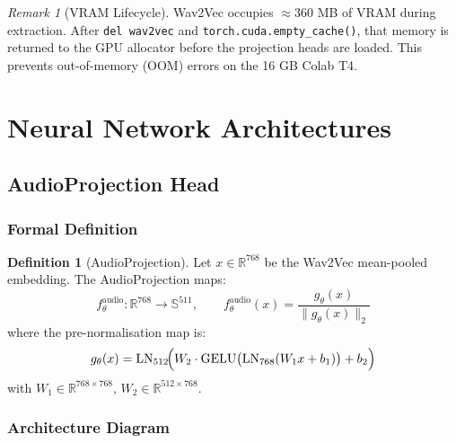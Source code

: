 \documentclass[12pt,a4paper]{article}
\theoremstyle{definition}
\newtheorem{definition}[theorem]{Definition}
\theoremstyle{remark}
\newtheorem{remark}[theorem]{Remark}
\begin{document}
\begin{remark}[VRAM Lifecycle]
Wav2Vec occupies $\approx$360 MB of VRAM during extraction. After
\texttt{del wav2vec} and \texttt{torch.cuda.empty\_cache()}, that memory
is returned to the GPU allocator before the projection heads are loaded.
This prevents out-of-memory (OOM) errors on the 16 GB Colab T4.
\end{remark}

\section{Neural Network Architectures}

\subsection{AudioProjection Head}

\subsubsection{Formal Definition}

\begin{definition}[AudioProjection]
Let $x \in \mathbb{R}^{768}$ be the Wav2Vec mean-pooled embedding.
The AudioProjection maps:
\[
  f_\theta^{\text{audio}} : \mathbb{R}^{768} \to \mathbb{S}^{511}, \qquad
  f_\theta^{\text{audio}}(x) = \frac{g_\theta(x)}{\|g_\theta(x)\|_2}
\]
where the pre-normalisation map is:
\[
  g_\theta(x) = \text{LN}_{512}\!\Bigl(W_2 \cdot \text{GELU}\bigl(\text{LN}_{768}(W_1 x + b_1)\bigr) + b_2\Bigr)
\]
with $W_1 \in \mathbb{R}^{768 \times 768}$, $W_2 \in \mathbb{R}^{512 \times 768}$.
\end{definition}

\subsubsection{Architecture Diagram}
\end{document}

